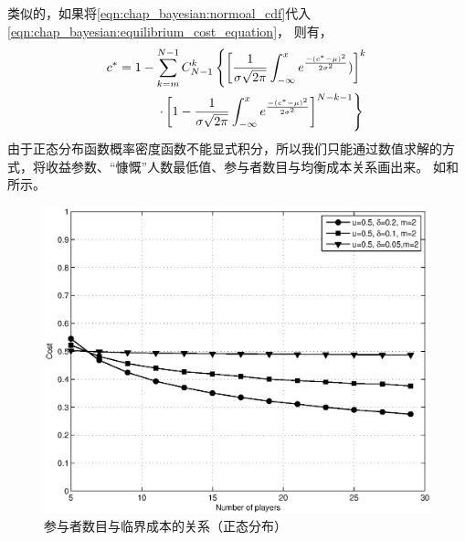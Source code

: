 类似的，如果将\eqref{eqn:chap_bayesian:normoal_cdf}代入\eqref{eqn:chap_bayesian:equilibrium_cost_equation}，
则有，
\begin{align} 
    c^* &= 1- \sum_{k=m}^{N-1}C_{N-1}^k \left\{\left[ \frac{1}{\sigma \sqrt{2\pi} } \int^x_{-\infty}e^{ \frac{-(c^*-\mu)^2}{2\sigma^2}})\right]^k \right. \notag \\
    & \qquad \left. \quad \cdot \left[1- \frac{1}{\sigma \sqrt{2\pi} } \int^x_{-\infty}e^{ \frac{-(c^*-\mu)^2}{2\sigma^2}}\right]^{N-k-1} \right\}
     \label{eqn:chap_bayesian:cost_normal_distribution_equation}
\end{align}
由于正态分布函数概率密度函数不能显式积分，所以我们只能通过数值求解的方式，将收益参数、“慷慨”人数最低值、参与者数目与均衡成本关系画出来。
如和所示。
\begin{figure}[tb]
\begin{centering}
\includegraphics[scale=0.5]{bayesian_normal_user_number_vs_contribute_probability.eps}
\caption{参与者数目与临界成本的关系（正态分布）}
\label{fig:bayesian_normal_user_numb_vs_contr_prob}
\end{centering}
\end{figure}
